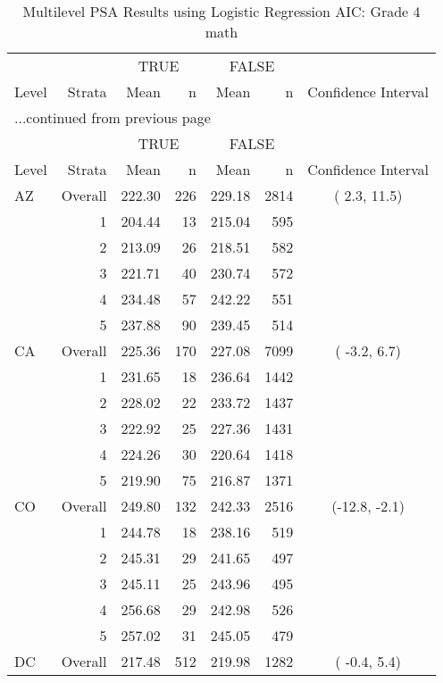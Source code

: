 \begin{longtable}{lrrr@{\extracolsep{.25cm}}rrc}
\caption{Multilevel PSA Results using Logistic Regression AIC: Grade 4 math} \\ 
   \hline & & \multicolumn{2}{c}{TRUE} & \multicolumn{2}{c}{FALSE} & \\ \cline{3-4} \cline{5-6} Level & Strata & Mean & n & Mean & n & Confidence Interval \\ \hline\endfirsthead \multicolumn{7}{l}{{...continued from previous page}}\\ \hline  & & \multicolumn{2}{c}{TRUE} & \multicolumn{2}{c}{FALSE} & \\ \cline{3-4} \cline{5-6} Level & Strata & Mean & n & Mean & n & Confidence Interval \\ \hline \endhead \endfoot \endlastfoot  \hline
AZ & Overall & 222.30 & 226 & 229.18 & 2814 & (  2.3, 11.5) \\ 
   & 1 & 204.44 &  13 & 215.04 & 595 &  \\ 
   & 2 & 213.09 &  26 & 218.51 & 582 &  \\ 
   & 3 & 221.71 &  40 & 230.74 & 572 &  \\ 
   & 4 & 234.48 &  57 & 242.22 & 551 &  \\ 
   & 5 & 237.88 &  90 & 239.45 & 514 &  \\ 
   \hline
CA & Overall & 225.36 & 170 & 227.08 & 7099 & ( -3.2,  6.7) \\ 
   & 1 & 231.65 &  18 & 236.64 & 1442 &  \\ 
   & 2 & 228.02 &  22 & 233.72 & 1437 &  \\ 
   & 3 & 222.92 &  25 & 227.36 & 1431 &  \\ 
   & 4 & 224.26 &  30 & 220.64 & 1418 &  \\ 
   & 5 & 219.90 &  75 & 216.87 & 1371 &  \\ 
   \hline
CO & Overall & 249.80 & 132 & 242.33 & 2516 & (-12.8, -2.1) \\ 
   & 1 & 244.78 &  18 & 238.16 & 519 &  \\ 
   & 2 & 245.31 &  29 & 241.65 & 497 &  \\ 
   & 3 & 245.11 &  25 & 243.96 & 495 &  \\ 
   & 4 & 256.68 &  29 & 242.98 & 526 &  \\ 
   & 5 & 257.02 &  31 & 245.05 & 479 &  \\ 
   \hline
DC & Overall & 217.48 & 512 & 219.98 & 1282 & ( -0.4,  5.4) \\ 

\end{longtable}
